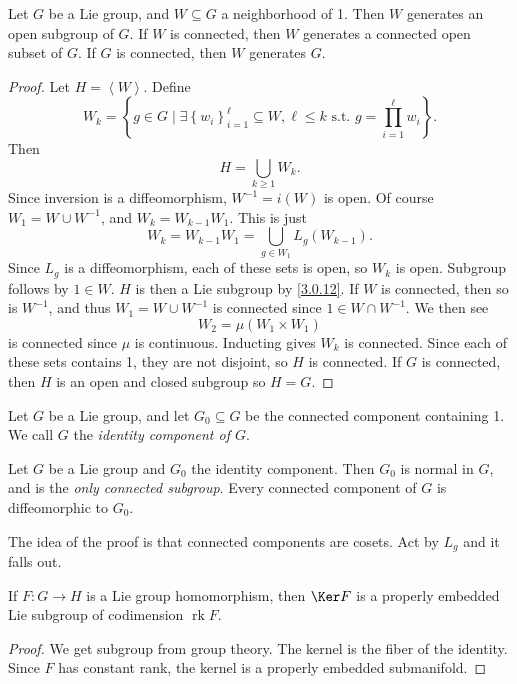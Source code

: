 \begin{proposition}\label{3.0.13}
	Let $G$ be a Lie group, and $W\subseteq G$ a neighborhood of 1. Then $W$ generates an open subgroup of $G$. If $W$ is connected, then $W$ generates a connected open subset of $G$. If $G$ is connected, then $W$ generates $G$.
\end{proposition}
\begin{proof}
	Let $H=\left\langle W \right\rangle $. Define
	\[
		W_k=\left\{ g\in G\mid \exists \left\{ w_i \right\}_{i=1} ^\ell\subseteq W,\ell \leq k \text{ s.t. }  g=\prod_{i=1}^{\ell } w_i \right\} 
	.\]
	Then
	\[
		H=\bigcup_{k\geq 1} W_k
	.\]
	Since inversion is a diffeomorphism, $W^{-1} =i(W)$ is open. Of course $W_1=W \cup W^{-1} $, and $W_k=W_{k-1} W_1$. This is just
	\[
		W_k=W_{k-1} W_1=\bigcup_{g\in W_1} L_g(W_{k-1} )
	.\]
	Since $L_g$ is a diffeomorphism, each of these sets is open, so $W_k$ is open. Subgroup follows by $1\in W$. $H$ is then a Lie subgroup by \cref{3.0.12}. If $W$ is connected, then so is $W^{-1} $, and thus $W_1=W \cup W^{-1} $ is connected since $1\in W \cap W^{-1} $. We then see
	\[
		W_2 = \mu (W_1 \times W_1)
	\]
	is connected since $\mu $ is continuous. Inducting gives $W_k$ is connected. Since each of these sets contains 1, they are not disjoint, so $H$ is connected. If $G$ is connected, then $H$ is an open and closed subgroup so $H=G$.
\end{proof}

\begin{definition}\label{3.0.14}
	Let $G$ be a Lie group, and let $G_0 \subseteq G$ be the connected component containing 1. We call $G$ the \emph{identity component of $G$}.
\end{definition}

\begin{proposition}\label{3.0.15}
	Let $G$ be a Lie group and $G_0$ the identity component. Then $G_0$ is normal in $G$, and is the \emph{only connected subgroup}. Every connected component of $G$ is diffeomorphic to $G_0$.
\end{proposition}
The idea of the proof is that connected components are cosets. Act by $L_g$ and it falls out.

\begin{proposition}\label{3.0.16}
	If $F : G \to H$ is a Lie group homomorphism, then $\Ker F$ is a properly embedded Lie subgroup of codimension $\operatorname{rk} F$.
\end{proposition}
\begin{proof}
	We get subgroup from group theory. The kernel is the fiber of the identity. Since $F$ has constant rank, the kernel is a properly embedded submanifold.
\end{proof}

